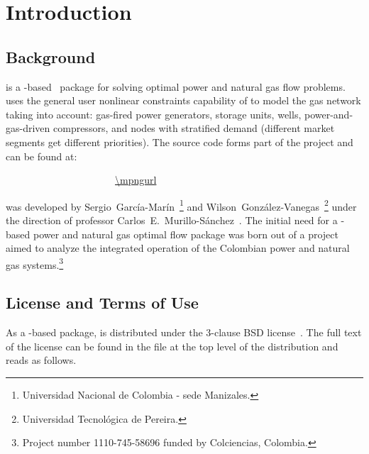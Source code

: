 \normalsize
{}
\setcounter{page}{1}

\chapter{Introduction}
\label{chap:intro}

\section{Background}
\label{sec:background}

\mpng{} is a \matpower{}-based~\cite{zimmerman2011,matpower} package for solving optimal power and natural gas flow problems. \mpng{} uses the general user nonlinear constraints capability of \matpower{} to model the gas network taking into account: gas-fired power generators, storage units, wells, power-and-gas-driven compressors, and nodes with stratified demand (different market segments get different priorities). The \mpng{} source code forms part of the \matpower{} project and can be found at:

\bigskip
~~~~~~~~~~~~~~~~~~~~~~\url{\mpngurl}
\bigskip

\noindent \mpng{} was developed by Sergio~García-Marín~\footnote[1]{ Universidad Nacional de Colombia - sede Manizales.\label{foot:UNAL}} and Wilson~González-Vanegas~\footnote[2]{ Universidad Tecnológica de Pereira.\label{foot:UTP}} under the direction of professor Carlos~E.~Murillo-S\'anchez~. The initial need for a \matpower{}-based power and natural gas optimal flow package was born out of a project aimed to analyze the integrated operation of the Colombian power and natural gas systems.\footnote[3]{ Project number 1110-745-58696 funded by Colciencias, Colombia.}

\section{License and Terms of Use}
\label{sec:license}

As a \matpower{}-based package, \mpng{} is distributed under the 3-clause BSD license~\cite{bsd}. The full text of the license can be found in the  file at the top level of the distribution and reads as follows. 

